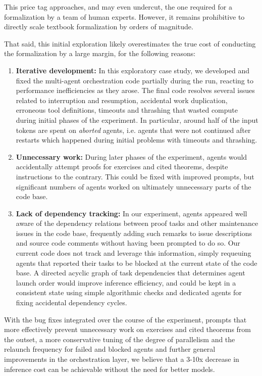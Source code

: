 \documentclass[]{fairmeta}
\begin{document}
This price tag approaches, and may even undercut, the one required for a formalization by a team of human experts. However, it remains prohibitive  to directly scale textbook formalization by orders of magnitude.

That said, this initial exploration likely overestimates the true cost of conducting the formalization by a large margin, for the following reasons:
\begin{enumerate}
\item \textbf{Iterative development:} In this exploratory case study, we developed and fixed the multi-agent orchestration code partially during the run, reacting to performance inefficiencies as they arose. The final code resolves several issues related to interruption and resumption, accidental work duplication, erroneous tool definitions, timeouts and thrashing that wasted compute during initial phases of the experiment. In particular, around half of the input tokens are spent on \emph{aborted} agents, i.e. agents that were not continued after restarts which happened during initial problems with timeouts and thrashing.
\item \textbf{Unnecessary work:} During later phases of the experiment, agents would accidentally attempt proofs for exercises and cited theorems, despite instructions to the contrary. This could be fixed with improved prompts, but significant numbers of agents worked on ultimately unnecessary parts of the code base. 
\item \textbf{Lack of dependency tracking:} In our experiment, agents appeared well aware of the dependency relations between proof tasks and other maintenance issues in the code base, frequently adding such remarks to issue descriptions and source code comments without having been prompted to do so. Our current code does not track and leverage this information, simply requeuing agents that reported their tasks to be blocked at the current state of the code base. A directed acyclic graph of task dependencies that determines agent launch order would improve inference efficiency, and could be kept in a consistent state using simple algorithmic checks and dedicated agents for fixing accidental dependency cycles.
\end{enumerate}
With the bug fixes integrated over the course of the experiment, prompts that more effectively prevent unnecessary work on exercises and cited theorems from the outset, a more conservative tuning of the degree of parallelism and the relaunch frequency for failed and blocked agents and further general improvements in the orchestration layer, we believe that a 3-10x decrease in inference cost can be achievable without the need for better models.
\end{document}
